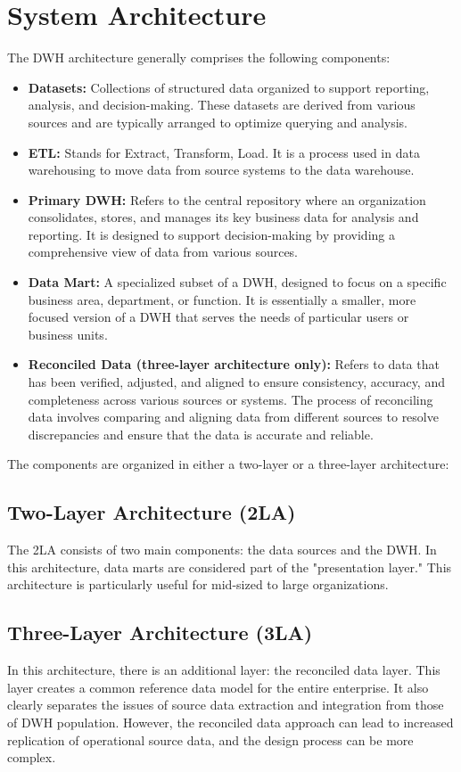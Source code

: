 \documentclass[conference]{IEEEtran}
\begin{document}
	\section{System Architecture}
	The DWH architecture generally comprises the following components:
	\begin{itemize}
		\item \textbf{Datasets:} Collections of structured data organized to support reporting, analysis, and decision-making. These datasets are derived from various sources and are typically arranged to optimize querying and analysis.
		\item \textbf{ETL:} Stands for Extract, Transform, Load. It is a process used in data warehousing to move data from source systems to the data warehouse.
		\item \textbf{Primary DWH:} Refers to the central repository where an organization consolidates, stores, and manages its key business data for analysis and reporting. It is designed to support decision-making by providing a comprehensive view of data from various sources.
		\item \textbf{Data Mart:} A specialized subset of a DWH, designed to focus on a specific business area, department, or function. It is essentially a smaller, more focused version of a DWH that serves the needs of particular users or business units.
		\item \textbf{Reconciled Data (three-layer architecture only):} Refers to data that has been verified, adjusted, and aligned to ensure consistency, accuracy, and completeness across various sources or systems. The process of reconciling data involves comparing and aligning data from different sources to resolve discrepancies and ensure that the data is accurate and reliable.
	\end{itemize}
	
	The components are organized in either a two-layer or a three-layer architecture:	
	\subsection{Two-Layer Architecture (2LA)}
	The 2LA consists of two main components: the data sources and the DWH. In this architecture, data marts are considered part of the "presentation layer." This architecture is particularly useful for mid-sized to large organizations.
	\subsection{Three-Layer Architecture (3LA)}
	In this architecture, there is an additional layer: the reconciled data layer. This layer creates a common reference data model for the entire enterprise. It also clearly separates the issues of source data extraction and integration from those of DWH population. However, the reconciled data approach can lead to increased replication of operational source data, and the design process can be more complex.
			
\end{document}
